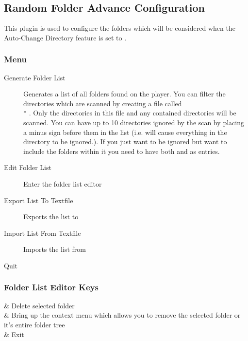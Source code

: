 \subsection{Random Folder Advance Configuration}
{\label{ref:random_folder_advance_config}}
This plugin is used to configure the folders which will be considered
when the Auto-Change Directory feature is set to .

\subsubsection{Menu}
\begin{description}
\item[Generate Folder List] Generates a list of all folders found 
on the player.  You can filter the directories which are scanned by
creating a file called \\* 
.  
Only the directories in this file and any contained directories
 will be scanned.  You can have up to 10 directories ignored by the 
 scan by placing a minus sign before them in the list 
 (i.e.  will cause everything in the  
 directory to be ignored.).  If you just want 
 to be ignored but want to include the folders within 
it you need to have both  and  as entries.
\item[Edit Folder List] Enter the folder list editor
\item[Export List To Textfile] Exports the list to 
\item[Import List From Textfile] Imports the list from
\item[Quit]
\end{description}

\subsubsection{Folder List Editor Keys}
\begin{table}
\begin{btnmap}{}{}
	\ActionStdOk{}  & Delete selected folder\\
	\ActionStdContext{} 
      & Bring up the context menu which allows you to
	remove the selected folder or it's entire folder tree\\
	\ActionStdCancel{}  & Exit\\
\end{btnmap}
\end{table}
